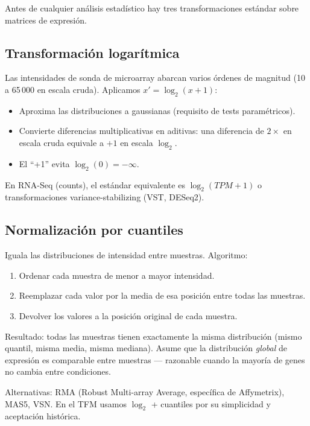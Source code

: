 \documentclass[11pt, a4paper]{article}
\begin{document}
Antes de cualquier an\'alisis estad\'istico hay tres transformaciones
est\'andar sobre matrices de expresi\'on.

\subsection{Transformaci\'on logar\'itmica}

Las intensidades de sonda de microarray abarcan varios \'ordenes de
magnitud (10 a 65\,000 en escala cruda). Aplicamos $x' = \log_2(x+1)$:

\begin{itemize}[leftmargin=1.2em]
  \item Aproxima las distribuciones a gaussianas (requisito de tests
  param\'etricos).
  \item Convierte diferencias multiplicativas en aditivas: una diferencia
  de $2 \times$ en escala cruda equivale a $+1$ en escala $\log_2$.
  \item El ``+1'' evita $\log_2(0) = -\infty$.
\end{itemize}

En RNA-Seq (counts), el est\'andar equivalente es $\log_2(TPM+1)$ o
transformaciones variance-stabilizing (VST, DESeq2).

\subsection{Normalizaci\'on por cuantiles}

Iguala las distribuciones de intensidad entre muestras. Algoritmo:

\begin{enumerate}[leftmargin=1.4em]
  \item Ordenar cada muestra de menor a mayor intensidad.
  \item Reemplazar cada valor por la media de esa posici\'on entre todas
  las muestras.
  \item Devolver los valores a la posici\'on original de cada muestra.
\end{enumerate}

Resultado: todas las muestras tienen exactamente la misma distribuci\'on
(mismo quantil, misma media, misma mediana). Asume que la distribuci\'on
\emph{global} de expresi\'on es comparable entre muestras --- razonable
cuando la mayor\'ia de genes no cambia entre condiciones.

Alternativas: RMA (Robust Multi-array Average, espec\'ifica de
Affymetrix), MAS5, VSN. En el TFM usamos $\log_2$ + cuantiles por su
simplicidad y aceptaci\'on hist\'orica.
\end{document}
